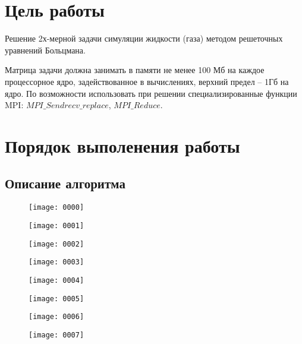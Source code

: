 	\section{Цель работы}
		Решение 2х-мерной задачи симуляции жидкости (газа) методом решеточных уравнений Больцмана.
		
		Матрица задачи должна занимать в памяти не менее 100 Мб на каждое процессорное ядро, задействованное в вычислениях, верхний предел – 1Гб на ядро. По возможности использовать при решении специализированные функции MPI: $ MPI\_Sendrecv\_replace $, $  MPI\_Reduce $.
	\section{Порядок выполенения работы}
	
		\subsection{Описание алгоритма}
			
			\begin{figure}[h]
				\centering
				\texttt{[image: 0000]}
				\caption[Начальные условия]{}
				\caption{}
				\label{fig:start}
			\end{figure}
			\begin{figure}[h]
				\centering
				\texttt{[image: 0001]}
				\caption{}
				\label{fig:asd}
			\end{figure}
			\begin{figure}[h]
				\centering
				\texttt{[image: 0002]}
				\caption{}
				\label{fig:asd}
			\end{figure}
			\begin{figure}[h]
				\centering
				\texttt{[image: 0003]}
				\caption{}
				\label{fig:1}
			\end{figure}
			\begin{figure}[h]
				\centering
				\texttt{[image: 0004]}
				\caption{}
				\label{fig:asd}
			\end{figure}
			\begin{figure}[h]
				\centering
				\texttt{[image: 0005]}
				\caption{}
				\label{fig:asd}
			\end{figure}
			\begin{figure}[h]
				\centering
				\texttt{[image: 0006]}
				\caption{}
				\label{fig:asd}
			\end{figure}
			\begin{figure}[h]
				\centering
				\texttt{[image: 0007]}
				\caption{}
				\label{fig:asd}
			\end{figure}

